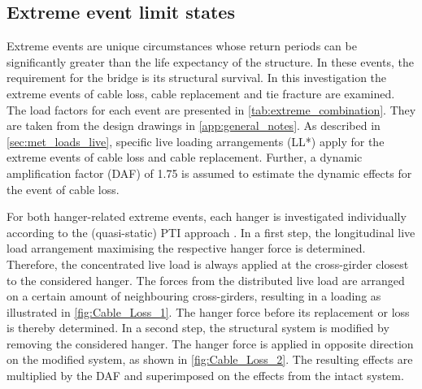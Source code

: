 \subsection{Extreme event limit states}\label{sec:extreme}
Extreme events are unique circumstances whose return periods can be significantly greater than the life expectancy of the structure. In these events, the requirement for the bridge is its structural survival. In this investigation the extreme events of cable loss, cable replacement and tie fracture are examined. The load factors for each event are presented in \cref{tab:extreme_combination}. They are taken from the design drawings in \cref{app:general_notes}. As described in \cref{sec:met_loads_live}, specific live loading arrangements (LL*) apply for the extreme events of cable loss and cable replacement. Further, a dynamic amplification factor (DAF) of 1.75 is assumed to estimate the dynamic effects for the event of cable loss.



For both hanger-related extreme events, each hanger is investigated individually according to the (quasi-static) PTI approach \cite{PTI}. In a first step, the longitudinal live load arrangement maximising the respective hanger force is determined. Therefore, the concentrated live load is always applied at the cross-girder closest to the considered hanger. The forces from the distributed live load are arranged on a certain amount of neighbouring cross-girders, resulting in a loading as illustrated in \cref{fig:Cable_Loss_1}. The hanger force before its replacement or loss is thereby determined. In a second step, the structural system is modified by removing the considered hanger. The hanger force is applied in opposite direction on the modified system, as shown in \cref{fig:Cable_Loss_2}. The resulting effects are multiplied by the DAF and superimposed on the effects from the intact system.

